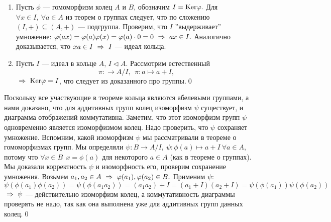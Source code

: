 \dok
\begin{enumerate}
    \item Пусть $\phi$ --- гомоморфизм колец $A$ и $B$, обозначим $I={\rm Ker}\varphi.$ Для $\forall x\in I,\ \forall a\in A$ из теорем о группах следует, что
    по сложению $(I,+)\subseteq(A,+)$ --- подгруппа. Проверим, что $I$ ''выдерживает'' умножение: $\varphi(ax)=\varphi(a)\varphi(x)=\varphi(a)\cdot 0=0\ \Rightarrow\  ax\in I.$
    Аналогично доказывается, что $xa\in I\ \Rightarrow\  I$ --- идеал кольца.
    \item Пусть $I$ --- идеал в кольце $A$, $I\lhd A.$ Рассмотрим естественный \г $$\pi : \rightarrow A/I,\ \ \pi : a\mapsto a+I,$$ $\ \Rightarrow\ {\rm Ker}\varphi=I$, что следует из
    доказанного про группы.\qquad\qed
\end{enumerate}


\dok Поскольку все участвующие в теореме кольца являются абелевыми группами, а нами доказано, что для аддитивных групп колец изоморфизм $\psi$ существует,
и диаграмма отображений коммутативна. Заметим, что этот изоморфизм групп $\psi$ одновременно является изоморфизмом колец. Надо проверить, что $\psi$ сохраняет умножение.
Вспомним, какой изоморфизм $\psi$ мы рассматривали в теореме о гомоморфизмах групп. Мы определяли $\psi : B\rightarrow A/I,\ \psi : \phi(a)\mapsto a+I\ \forall a\in A,$ потому что
$\forall x\in B\ \ x=\phi(a)$ для некоторого $a\in A$ (как в теореме о группах). Мы доказали корректность $\psi$ и изоморфность его, проверим сохранение умножения.
Возьмем $a_1, a_2\in A\ \Rightarrow\  \varphi(a_1), \varphi(a_2)\in B.$ Применим $\psi$:
$$
\psi(\phi(a_1)\phi(a_2))=\psi(\phi(a_1a_2))=(a_1a_2)+I=(a_1+I)(a_2+I)=\psi(\phi(a_1))\psi(\phi(a_2))
$$
$\ \Rightarrow\  \psi$ --- действительно изоморфизм колец, а коммутативность диаграммы проверять не надо, так как она выполнена уже для аддитивных групп данных колец.\qquad\qed

